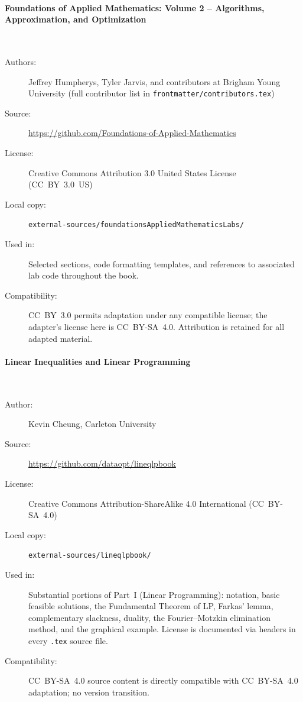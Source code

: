 \paragraph{Foundations of Applied Mathematics: Volume 2 -- Algorithms,
  Approximation, and Optimization}\hspace{0pt}\\[-0.6em]
\begin{description}
  \item[Authors:] Jeffrey Humpherys, Tyler Jarvis, and contributors at
    Brigham Young University (full contributor list in
    \texttt{frontmatter/contributors.tex})
  \item[Source:] \url{https://github.com/Foundations-of-Applied-Mathematics}
  \item[License:] Creative Commons Attribution 3.0 United States License
    (CC~BY~3.0~US)
  \item[Local copy:] \texttt{external-sources/foundationsAppliedMathematicsLabs/}
  \item[Used in:] Selected sections, code formatting templates, and
    references to associated lab code throughout the book.
  \item[Compatibility:] CC~BY~3.0 permits adaptation under any
    compatible license; the adapter's license here is CC~BY-SA~4.0.
    Attribution is retained for all adapted material.
\end{description}

\paragraph{Linear Inequalities and Linear Programming}\hspace{0pt}\\[-0.6em]
\begin{description}
  \item[Author:] Kevin Cheung, Carleton University
  \item[Source:] \url{https://github.com/dataopt/lineqlpbook}
  \item[License:] Creative Commons Attribution-ShareAlike 4.0
    International (CC~BY-SA~4.0)
  \item[Local copy:] \texttt{external-sources/lineqlpbook/}
  \item[Used in:] Substantial portions of Part~I (Linear Programming):
    notation, basic feasible solutions, the Fundamental Theorem of LP,
    Farkas' lemma, complementary slackness, duality, the Fourier--Motzkin
    elimination method, and the graphical example. License is documented
    via headers in every \texttt{.tex} source file.
  \item[Compatibility:] CC~BY-SA~4.0 source content is directly
    compatible with CC~BY-SA~4.0 adaptation; no version transition.
\end{description}

